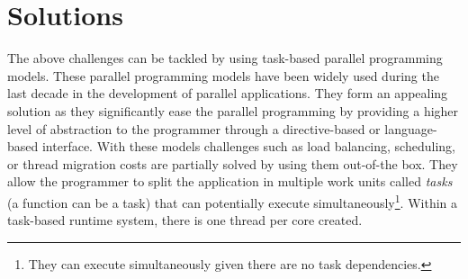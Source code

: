 \section{Solutions}
The above challenges can be tackled by using task-based parallel programming models.
These parallel programming models have been widely used during the last decade in the development of parallel applications.
They form an appealing solution as they significantly ease the parallel programming by providing a higher level of abstraction to the programmer through a directive-based or language-based interface.
With these models challenges such as load balancing, scheduling, or thread migration costs are partially solved by using them out-of-the box.
They allow the programmer to split the application in multiple work units called \textit{tasks} (a function can be a task) that can potentially execute simultaneously\footnote{They can execute simultaneously given there are no task dependencies.}.
Within a task-based runtime system, there is one thread per core created. 





